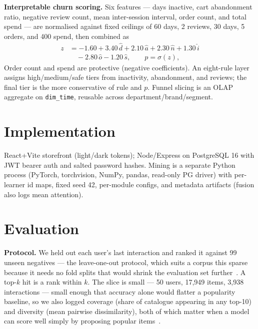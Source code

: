 \documentclass[conference]{IEEEtran}
\begin{document}
\textbf{Interpretable churn scoring.} Six features --- days inactive, cart
abandonment ratio, negative review count, mean inter-session interval, order count,
and total spend --- are normalised against fixed ceilings of 60 days, 2 reviews,
30 days, 5 orders, and 400 spend, then combined as
\begin{equation}
\begin{split}
z &= -1.60 + 3.40\,\hat{d} + 2.10\,\hat{a} + 2.30\,\hat{n}
     + 1.30\,\hat{i} \\
  &\quad - 2.80\,\hat{o} - 1.20\,\hat{s},
\qquad p = \sigma(z),
\end{split}
\label{eq:churn}
\end{equation}
Order count and spend are protective (negative coefficients). An eight-rule layer
assigns high/medium/safe tiers from inactivity, abandonment, and reviews; the final
tier is the more conservative of rule and $p$. Funnel slicing is an OLAP aggregate
on \texttt{dim\_time}, reusable across department/brand/segment.

\section{Implementation}
\label{sec:impl}

React+Vite storefront (light/dark tokens); Node/Express on PostgreSQL 16 with JWT
bearer auth and salted password hashes. Mining is a separate Python process
(PyTorch, torchvision, NumPy, pandas, read-only PG driver) with per-learner id maps,
fixed seed 42, per-module configs, and metadata artifacts (fusion also logs mean
attention).

\section{Evaluation}
\label{sec:eval}

\textbf{Protocol.} We held out each user's last interaction and ranked it against 99
unseen negatives --- the leave-one-out protocol, which suits a corpus this sparse
because it needs no fold splits that would shrink the evaluation set
further~\cite{ferrari2019protocols}. A top-$k$ hit is a rank within $k$. The slice
is small --- 50 users, 17{,}949 items, 3{,}938 interactions --- small enough that
accuracy alone would flatter a popularity baseline, so we also logged coverage
(share of catalogue appearing in any top-10) and diversity (mean pairwise
dissimilarity), both of which matter when a model can score well simply by
proposing popular items~\cite{kempe2011metrics}.
\end{document}
